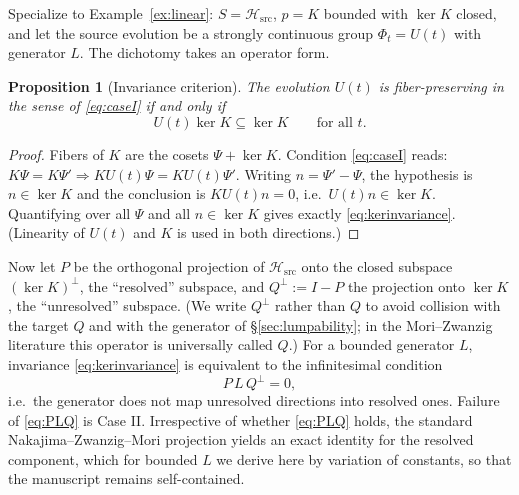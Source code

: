 \documentclass[11pt,reqno]{amsart}
\theoremstyle{plain}
\newtheorem{proposition}[theorem]{Proposition}
\theoremstyle{definition}
\theoremstyle{remark}
\newcommand{\Hsrc}{\mathcal{H}_{\mathrm{src}}}
\begin{document}
Specialize to Example~\ref{ex:linear}: $S=\Hsrc$, $p=K$ bounded with $\ker K$ closed, and let the source evolution be a strongly continuous group $\Phi_t=U(t)$ with generator $L$. The dichotomy takes an operator form.

\begin{proposition}[Invariance criterion]\label{prop:invariance}
The evolution $U(t)$ is fiber-preserving in the sense of \eqref{eq:caseI} if and only if
\begin{equation}\label{eq:kerinvariance}
U(t)\ker K\subseteq\ker K\qquad\text{for all }t .
\end{equation}
\end{proposition}

\begin{proof}
Fibers of $K$ are the cosets $\Psi+\ker K$. Condition \eqref{eq:caseI} reads: $K\Psi=K\Psi'\Rightarrow KU(t)\Psi=KU(t)\Psi'$. Writing $n=\Psi'-\Psi$, the hypothesis is $n\in\ker K$ and the conclusion is $KU(t)n=0$, i.e.\ $U(t)n\in\ker K$. Quantifying over all $\Psi$ and all $n\in\ker K$ gives exactly \eqref{eq:kerinvariance}. (Linearity of $U(t)$ and $K$ is used in both directions.)
\end{proof}

Now let $P$ be the orthogonal projection of $\Hsrc$ onto the closed subspace $(\ker K)^{\perp}$, the ``resolved'' subspace, and $Q^{\!\perp}:=I-P$ the projection onto $\ker K$, the ``unresolved'' subspace. (We write $Q^{\!\perp}$ rather than $Q$ to avoid collision with the target $Q$ and with the generator of \S\ref{sec:lumpability}; in the Mori--Zwanzig literature this operator is universally called $Q$.) For a bounded generator $L$, invariance \eqref{eq:kerinvariance} is equivalent to the infinitesimal condition
\begin{equation}\label{eq:PLQ}
P\,L\,Q^{\!\perp}=0 ,
\end{equation}
i.e.\ the generator does not map unresolved directions into resolved ones. Failure of \eqref{eq:PLQ} is Case II. Irrespective of whether \eqref{eq:PLQ} holds, the standard Nakajima--Zwanzig--Mori projection \cite{Nakajima1958,Zwanzig1960,Mori1965} yields an exact identity for the resolved component, which for bounded $L$ we derive here by variation of constants, so that the manuscript remains self-contained.
\end{document}
